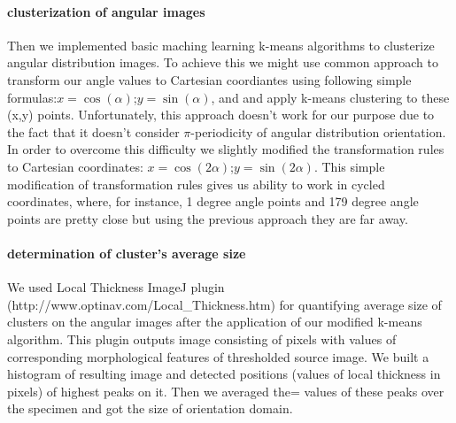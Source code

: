 \paragraph{clusterization of angular images}
Then we implemented basic maching learning k-means algorithms to clusterize angular distribution images.
To achieve this we might use common approach to transform our angle values to Cartesian coordiantes using following simple formulas:$x=\cos(\alpha)$;$y=\sin(\alpha)$, and and apply k-means clustering to these (x,y) points.
Unfortunately, this approach doesn't work for our purpose due to the fact that it doesn't consider $\pi$-periodicity of angular distribution orientation.
In order to overcome this difficulty we slightly modified the transformation rules to Cartesian coordinates: $x=\cos(2\alpha)$;$y=\sin(2\alpha)$.
This simple modification of transformation rules  gives us ability to work in cycled coordinates, where, for instance, 1 degree angle points and 179 degree angle points are pretty close but using the previous approach they are far away.     
\paragraph{determination of cluster's average size}
We used Local Thickness ImageJ plugin (http://www.optinav.com/Local\_Thickness.htm) for quantifying average size of clusters on the angular images after the application of our modified k-means algorithm.
This plugin outputs image consisting of pixels with values of corresponding morphological features of thresholded source image.
We built a  histogram of resulting image and detected positions (values of local thickness in pixels) of highest peaks on it.
Then we averaged the= values of these peaks over the specimen and got the size of orientation domain.  
